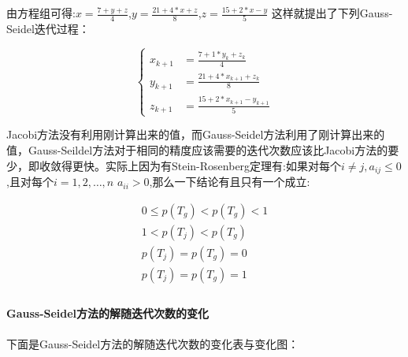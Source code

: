 由方程组可得:$x=\frac{7+y+z}{4}$,$y=\frac{21+4*x+z}{8}$,$z=\frac{15+2*x-y}{5}$
这样就提出了下列Gauss-Seidel迭代过程：

$$ \left\{
\begin{aligned}
x_{k+1}& =\frac{7+1*y_k+z_k}{4} \\
y_{k+1}& =\frac{21+4 * x_{k+1}+z_k}{8} \\
z_{k+1}& =\frac{15+2*x_{k+1}-y_{k+1}}{5}
\end{aligned}
\right.
$$

Jacobi方法没有利用刚计算出来的值，而Gauss-Seidel方法利用了刚计算出来的值，Gauss-Seildel方法对于相同的精度应该需要的迭代次数应该比Jacobi方法的要少，即收敛得更快。实际上因为有Stein-Rosenberg定理有:如果对每个$i≠j,a_{ij}≤0$,且对每个$i=1,2,…,n$ $ a_{ii}>0$,那么一下结论有且只有一个成立:

\begin{align*}
0 \leq p(T_g) < p(T_g) < 1\\
1 < p(T_j)<p(T_g)\\
p(T_j)=p(T_g)=0\\
p(T_j)=p(T_g)=1\\
\end{align*}

\paragraph{Gauss-Seidel方法的解随迭代次数的变化}

下面是Gauss-Seidel方法的解随迭代次数的变化表与变化图：


